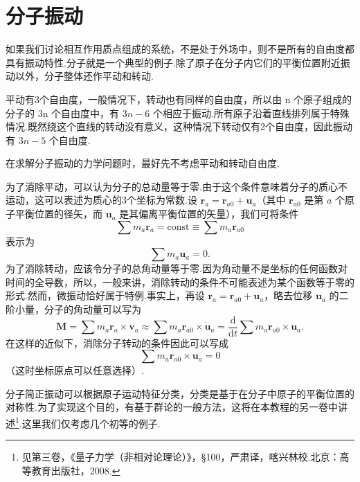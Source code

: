 \section{分子振动}

如果我们讨论相互作用质点组成的系统，不是处于外场中，则不是所有的自由度都具有振动特性.分子就是一个典型的例子.除了原子在分子内它们的平衡位置附近振动以外，分子整体还作平动和转动.

平动有3个自由度，一般情况下，转动也有同样的自由度，所以由 n 个原子组成的分子的 3n 个自由度中，有 $3n-6$ 个相应于振动.所有原子沿着直线排列属于特殊情况.既然绕这个直线的转动没有意义，这种情况下转动仅有2个自由度，因此振动有 $3n-5$ 个自由度.

在求解分子振动的力学问题时，最好先不考虑平动和转动自由度.

为了消除平动，可以认为分子的总动量等于零.由于这个条件意味着分子的质心不运动，这可以表述为质心的3个坐标为常数.设 $\boldsymbol{r}_a=\boldsymbol{r}_{a0}+\boldsymbol{u}_a$（其中 $\boldsymbol{r}_{a0}$ 是第 $a$ 个原子平衡位置的径矢，而 $\boldsymbol{u}_a$ 是其偏离平衡位置的矢量），我们可将条件
\begin{equation*}
  \sum m_a\boldsymbol{r}_a=\mathrm{const}\equiv\sum m_a\boldsymbol{r}_{a0}
\end{equation*}
表示为
\begin{equation}
  \sum m_a\boldsymbol{u}_a=0.
\end{equation}
为了消除转动，应该令分子的总角动量等于零.因为角动量不是坐标的任何函数对时间的全导数，所以，一般来讲，消除转动的条件不可能表述为某个函数等于零的形式.然而，微振动恰好属于特例.事实上，再设 $\boldsymbol{r}_a=\boldsymbol{r}_{a0}+\boldsymbol{u}_a$，略去位移 $\boldsymbol{u}_a$ 的二阶小量，分子的角动量可以写为
\begin{equation*}
  \boldsymbol{M}=\sum m_a\boldsymbol{r}_a\times\boldsymbol{v}_a
  \approx\sum m_a\boldsymbol{r}_{a0}\times\dot{\boldsymbol{u}}_a
  =\frac{\mathrm{d}}{\mathrm{d}t}\sum m_a\boldsymbol{r}_{a0}\times\boldsymbol{u}_a.
\end{equation*}
在这样的近似下，消除分子转动的条件因此可以写成
\begin{equation}
  \sum m_a\boldsymbol{r}_{a0}\times\boldsymbol{u}_a=0
\end{equation}
（这时坐标原点可以任意选择）.

分子简正振动可以根据原子运动特征分类，分类是基于在分子中原子的平衡位置的对称性.为了实现这个目的，有基于群论的一般方法，这将在本教程的另一卷中讲述\footnote{见第三卷，《量子力学（非相对论理论）》，§100，严肃译，喀兴林校.北京：高等教育出版社，2008.}.这里我们仅考虑几个初等的例子.

